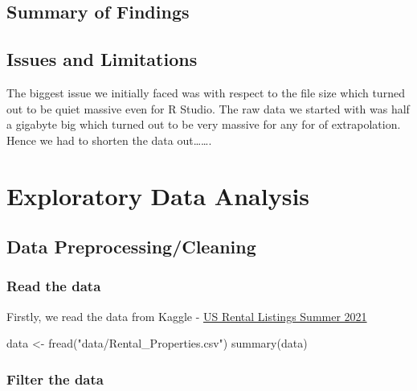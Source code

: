 \documentclass[
]{article}
\newenvironment{Shaded}{\begin{snugshade}}{\end{snugshade}}
\newcommand{\FunctionTok}[1]{\textcolor[rgb]{0.00,0.00,0.00}{#1}}
\newcommand{\NormalTok}[1]{#1}
\newcommand{\OtherTok}[1]{\textcolor[rgb]{0.56,0.35,0.01}{#1}}
\newcommand{\StringTok}[1]{\textcolor[rgb]{0.31,0.60,0.02}{#1}}
\begin{document}
\hypertarget{summary-of-findings}{%
\subsection{Summary of Findings}\label{summary-of-findings}}

\hypertarget{issues-and-limitations}{%
\subsection{Issues and Limitations}\label{issues-and-limitations}}

The biggest issue we initially faced was with respect to the file size
which turned out to be quiet massive even for R Studio. The raw data we
started with was half a gigabyte big which turned out to be very massive
for any for of extrapolation. Hence we had to shorten the data
out\ldots\ldots.

\hypertarget{exploratory-data-analysis}{%
\section{Exploratory Data Analysis}\label{exploratory-data-analysis}}

\hypertarget{data-preprocessingcleaning}{%
\subsection{Data
Preprocessing/Cleaning}\label{data-preprocessingcleaning}}

\hypertarget{read-the-data}{%
\subsubsection{Read the data}\label{read-the-data}}

Firstly, we read the data from Kaggle -
\href{https://www.kaggle.com/datasets/elizabethveillon/us-rental-listings-summer-2021}{US
Rental Listings Summer 2021}

\begin{Shaded}
\begin{Highlighting}[]
\NormalTok{data }\OtherTok{\textless{}{-}} \FunctionTok{fread}\NormalTok{(}\StringTok{"data/Rental\_Properties.csv"}\NormalTok{)}
\FunctionTok{summary}\NormalTok{(data)}
\end{Highlighting}
\end{Shaded}

\hypertarget{filter-the-data}{%
\subsubsection{Filter the data}\label{filter-the-data}}
\end{document}
